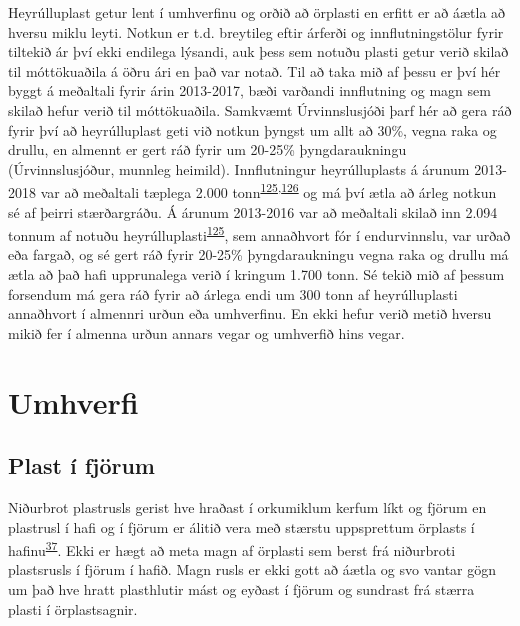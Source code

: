 \documentclass[icelandic,]{book}
\begin{document}
Heyrúlluplast getur lent í umhverfinu og orðið að örplasti en erfitt er að áætla að hversu miklu leyti. Notkun er t.d. breytileg eftir árferði og innflutningstölur fyrir tiltekið ár því ekki endilega lýsandi, auk þess sem notuðu plasti getur verið skilað til móttökuaðila á öðru ári en það var notað. Til að taka mið af þessu er því hér byggt á meðaltali fyrir árin 2013-2017, bæði varðandi innflutning og magn sem skilað hefur verið til móttökuaðila. Samkvæmt Úrvinnslusjóði þarf hér að gera ráð fyrir því að heyrúlluplast geti við notkun þyngst um allt að 30\%, vegna raka og drullu, en almennt er gert ráð fyrir um 20-25\% þyngdaraukningu (Úrvinnslusjóður, munnleg heimild).
Innflutningur heyrúlluplasts á árunum 2013-2018 var að meðaltali tæplega 2.000 tonn\textsuperscript{\protect\hyperlink{ref-Urvinnslusjouxf0ur2016}{125},\protect\hyperlink{ref-tollurinn}{126}} og má því ætla að árleg notkun sé af þeirri stærðargráðu. Á árunum 2013-2016 var að meðaltali skilað inn 2.094 tonnum af notuðu heyrúlluplasti\textsuperscript{\protect\hyperlink{ref-Urvinnslusjouxf0ur2016}{125}}, sem annaðhvort fór í endurvinnslu, var urðað eða fargað, og sé gert ráð fyrir 20-25\% þyngdaraukningu vegna raka og drullu má ætla að það hafi upprunalega verið í kringum 1.700 tonn. Sé tekið mið af þessum forsendum má gera ráð fyrir að árlega endi um 300 tonn af heyrúlluplasti annaðhvort í almennri urðun eða umhverfinu. En ekki hefur verið metið hversu mikið fer í almenna urðun annars vegar og umhverfið hins vegar.

\hypertarget{umhverfi}{%
\section*{Umhverfi}\label{umhverfi}}

\hypertarget{plast-i-fjorum}{%
\subsection*{Plast í fjörum}\label{plast-i-fjorum}}

Niðurbrot plastrusls gerist hve hraðast í orkumiklum kerfum líkt og fjörum en plastrusl í hafi og í fjörum er álitið vera með stærstu uppsprettum örplasts í hafinu\textsuperscript{\protect\hyperlink{ref-andrady2011microplastics}{37}}. Ekki er hægt að meta magn af örplasti sem berst frá niðurbroti plastsrusls í fjörum í hafið. Magn rusls er ekki gott að áætla og svo vantar gögn um það hve hratt plasthlutir mást og eyðast í fjörum og sundrast frá stærra plasti í örplastsagnir.
\end{document}
